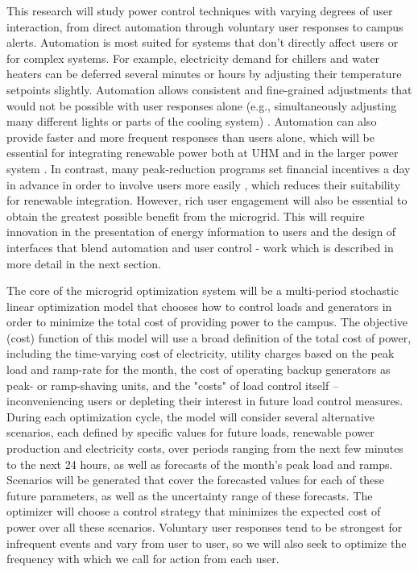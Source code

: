 This research will study power control techniques with varying degrees of user 
interaction, from direct automation through voluntary user responses to campus 
alerts. Automation is most suited for systems that don't directly affect users or
for complex systems. For example, electricity demand for chillers and water
heaters can be deferred several minutes or hours by adjusting their
temperature setpoints slightly. Automation allows consistent and
fine-grained adjustments that would not be possible with user responses
alone (e.g., simultaneously adjusting many different lights or parts of the
cooling system) \cite{Motegi07, Piette06}. Automation can also provide
faster and more frequent responses than users alone, which will be
essential for integrating renewable power both at UHM and in the larger
power system \cite{Stromback11,Callaway09}.  In contrast, many
peak-reduction programs set financial incentives a day in advance in order
to involve users more easily \cite{Boisvert04, Stromback11}, which reduces
their suitability for renewable integration. However, rich user engagement 
will also be essential to obtain the greatest possible benefit from the 
microgrid. This will require innovation in the presentation of energy 
information to users and the design of interfaces that blend automation and 
user control - work which is described in more detail in the next section.
 
The core of the microgrid optimization system will be a multi-period stochastic
linear optimization model \cite{Kall05} that chooses how to control loads and 
generators in order to minimize the total cost of providing power to the campus. 
The objective (cost) function of this model will use a broad definition
of the total cost of power, including the time-varying cost of electricity, 
utility charges based on the peak load and ramp-rate for the month,
the cost of operating backup generators as peak- or ramp-shaving units, 
and the "costs" of load control itself -- inconveniencing users or 
depleting their interest in future load control measures.
During each optimization cycle, the model will consider
several alternative scenarios, each defined by specific values for future
loads, renewable power production and electricity costs, over periods ranging from 
the next few minutes to the next 24 hours, as well as forecasts of the month's peak load 
and ramps. Scenarios will be generated that cover the forecasted values 
for each of these future parameters, as well as the uncertainty range of these
forecasts. The optimizer will choose a control strategy that minimizes
the expected cost of power over all these scenarios. Voluntary user responses 
tend to be strongest for infrequent events \cite{Boisvert04}
 \cite{Faruqui10, Stromback11} and vary from user to user, so we 
will also seek to optimize the frequency with which we call for action from each user.

